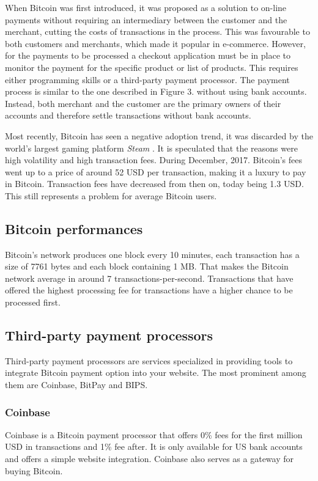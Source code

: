 \documentclass{ferseminar}
\begin{document}
When Bitcoin was first introduced, it was proposed as a solution to on-line payments without requiring an intermediary between the customer and the merchant, cutting the costs of transactions in the process. This was favourable to both customers and merchants, which made it popular in e-commerce. However, for the payments to be processed a checkout application must be in place to monitor the payment for the specific product or list of products. This requires either programming skills or a third-party payment processor. The payment process is similar to the one described in Figure 3. without using bank accounts. Instead, both merchant and the customer are the primary owners of their accounts and therefore settle transactions without bank accounts.

Most recently, Bitcoin has seen a negative adoption trend, it was discarded by the world's largest gaming platform \textit{Steam} \cite{Steam}. It is speculated that the reasons were high volatility and high transaction fees. During December, 2017. Bitcoin's fees went up to a price of around 52 USD per transaction, making it a luxury to pay in Bitcoin. Transaction fees have decreased from then on, today being 1.3 USD. This still represents a problem for average Bitcoin users.


\subsection{Bitcoin performances}
Bitcoin's network produces one block every 10 minutes, each transaction has a size of 7761 bytes and each block containing 1 MB. That makes the Bitcoin network average in around 7 transactions-per-second. Transactions that have offered the highest processing fee for transactions have a higher chance to be processed first.


\subsection{Third-party payment processors}
Third-party payment processors are services specialized in providing tools to integrate Bitcoin payment option into your website. The most prominent among them are Coinbase, BitPay and BIPS. 

\subsubsection{Coinbase}
Coinbase is a Bitcoin payment processor that offers 0\% fees for the first million USD in transactions and 1\% fee after. It is only available for US bank accounts and offers a simple website integration. Coinbase also serves as a gateway for buying Bitcoin.
\end{document}
